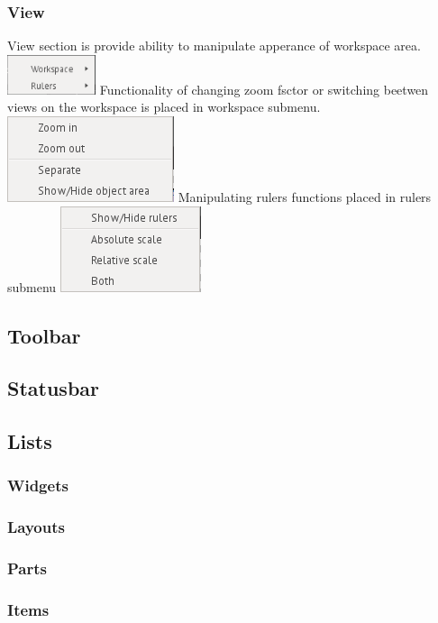 \documentclass[titlepage,oneside,11pt]{book}
\begin{document}
\subsubsection{View}
View section is provide ability to manipulate apperance of workspace area.
\includegraphics{images/view_menu.png}
Functionality of changing zoom fsctor or switching beetwen views on the workspace is placed in workspace submenu.
\includegraphics{images/view_workspace_submenu.png}
Manipulating rulers functions placed in rulers submenu
\includegraphics{images/view_rulers_submenu.png}
\subsection{Toolbar}
\subsection{Statusbar}
\subsection{Lists}
\subsubsection{Widgets}
\subsubsection{Layouts}
\subsubsection{Parts}
\subsubsection{Items}
\end{document}
